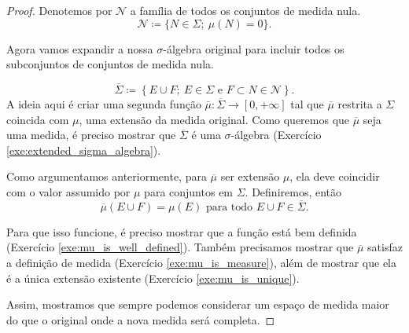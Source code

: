 \begin{proof}
    Denotemos por $\mathcal{N}$ a família de todos os conjuntos de medida nula.
    \begin{equation*}
        \mathcal{N}\coloneqq \{N\in\Sigma; \ \mu(N)=0\}.
    \end{equation*}
    
    Agora vamos expandir a nossa \texorpdfstring{$\sigma$}{sigma}-álgebra original para incluir todos os subconjuntos de conjuntos de medida nula.
    
    \begin{equation*}
        \overline{\Sigma}\coloneqq \left\{E\cup F; \ E\in \Sigma \text{ e } F\subset N\in\mathcal{N}\right\}.
    \end{equation*} 
    A ideia aqui é criar uma segunda função $\overline{\mu}:\overline{\Sigma}\rightarrow \left[0,+\infty\right]$ tal que $\overline{\mu}$ restrita a $\Sigma$ coincida com $\mu$, uma extensão da medida original. Como queremos que $\overline{\mu}$ seja uma medida, é preciso mostrar que $\overline{\Sigma}$ é uma \texorpdfstring{$\sigma$}{sigma}-álgebra (Exercício \ref{exe:extended_sigma_algebra}).

    Como argumentamos anteriormente, para $\overline{\mu}$ ser extensão $\mu$, ela deve coincidir com o valor assumido por $\mu$ para conjuntos em $\Sigma$. Definiremos, então
    \begin{equation*}
    \overline{\mu}(E\cup F) = \mu(E) \text{ para todo } E\cup F \in \overline{\Sigma}.
    \end{equation*}

    Para que isso funcione, é preciso mostrar que a função está bem definida (Exercício \ref{exe:mu_is_well_defined}). Também precisamos mostrar que $\overline{\mu}$ satisfaz a definição de medida (Exercício \ref{exe:mu_is_measure}), além de mostrar que ela é a única extensão existente (Exercício \ref{exe:mu_is_unique}).

    Assim, mostramos que sempre podemos considerar um espaço de medida maior do que o original onde a nova medida será completa.
\end{proof}